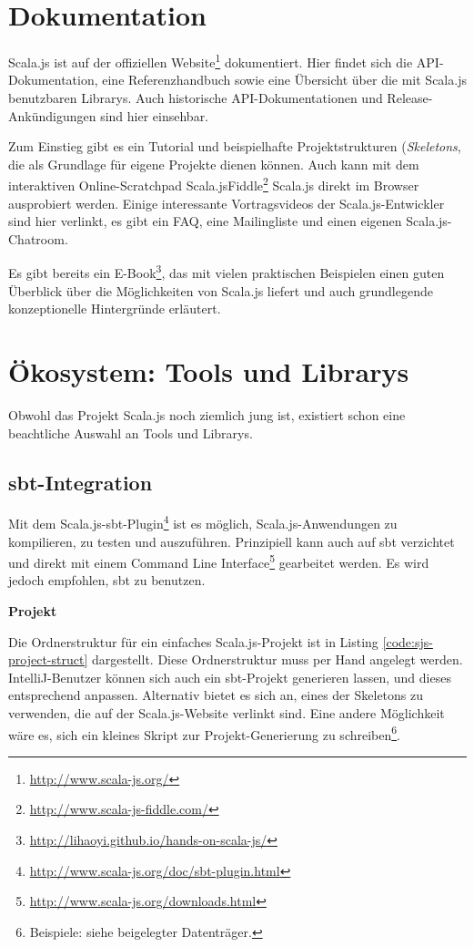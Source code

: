 \documentclass[a4paper, 12pt, hidelinks, listof=totoc, listoftables=totoc, bibliography=totoc]{scrreprt}
\newcommand{\MyMiniSec}[1]{\rmfamily\fontsize{12}{15}\selectfont
	\vspace{7pt}\textbf{#1} %
}
\begin{document}
\section{Dokumentation}

Scala.js ist auf der offiziellen Website\footnote{\url{http://www.scala-js.org/}} dokumentiert. Hier findet sich die \ac{API}-Dokumentation, eine Referenzhandbuch sowie eine Übersicht über die mit Scala.js benutzbaren Librarys. Auch historische \ac{API}-Dokumentationen und  Release-Ankündigungen sind hier einsehbar.

Zum Einstieg gibt es ein Tutorial und beispielhafte Projektstrukturen (\emph{Skeletons}, die als Grundlage für eigene Projekte dienen können. Auch kann mit dem interaktiven Online-Scratchpad Scala.jsFiddle\footnote{\url{http://www.scala-js-fiddle.com/}} Scala.js direkt im Browser ausprobiert werden. Einige interessante Vortragsvideos der Scala.js-Entwickler sind hier verlinkt, es gibt ein FAQ, eine Mailingliste und einen eigenen Scala.js-Chatroom.

Es gibt bereits ein E-Book\footnote{\url{http://lihaoyi.github.io/hands-on-scala-js/}}, das mit vielen praktischen Beispielen einen guten Überblick über die Möglichkeiten von Scala.js liefert und auch grundlegende konzeptionelle Hintergründe erläutert.


\section{Ökosystem: Tools und Librarys}\label{sec:sjs-libs}

Obwohl das Projekt Scala.js noch ziemlich jung ist, existiert schon eine beachtliche Auswahl an Tools und Librarys. 


\subsection{sbt-Integration}\label{subsec:sjs-sbt}

Mit dem Scala.js-sbt-Plugin\footnote{\url{http://www.scala-js.org/doc/sbt-plugin.html}} ist es möglich, Scala.js-Anwendungen zu kompilieren, zu testen und auszuführen.
Prinzipiell kann auch auf sbt verzichtet und direkt mit einem Command Line Interface\footnote{\url{http://www.scala-js.org/downloads.html}} gearbeitet werden. Es wird jedoch empfohlen, sbt zu benutzen.


\MyMiniSec{Projekt}

Die Ordnerstruktur für ein einfaches Scala.js-Projekt ist in Listing \ref{code:sjs-project-struct} dargestellt. Diese Ordnerstruktur muss per Hand angelegt werden. IntelliJ-Benutzer können sich auch ein sbt-Projekt generieren lassen, und dieses entsprechend anpassen. Alternativ bietet es sich an, eines der Skeletons zu verwenden, die auf der Scala.js-Website verlinkt sind. Eine andere Möglichkeit wäre es, sich ein kleines Skript zur Projekt-Generierung zu schreiben\footnote{Beispiele: siehe beigelegter Datenträger.}.
\end{document}
